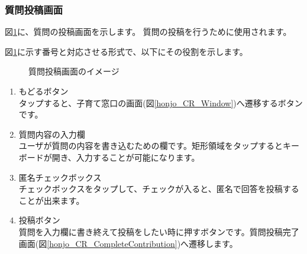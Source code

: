 \documentclass[a4j]{jarticle}
\begin{document}
\subsubsection{質問投稿画面}
図\ref{honjo_CR_Contribution}に、質問の投稿画面を示します。
質問の投稿を行うために使用されます。

図\ref{honjo_CR_Contribution}に示す番号と対応させる形式で、以下にその役割を示します。

\begin{figure}[H]
    \begin{center}
    \caption {質問投稿画面のイメージ}
    \label{honjo_CR_Contribution}
    \end{center}
\end{figure}

\begin{enumerate}
  \renewcommand{\labelenumi}{\textcircled{\scriptsize \theenumi}}
  \item もどるボタン\\
        タップすると、子育て窓口の画面(図\ref{honjo_CR_Window})へ遷移するボタンです。
  \item 質問内容の入力欄\\
        ユーザが質問の内容を書き込むための欄です。矩形領域をタップするとキーボードが開き、入力することが可能になります。
  \item 匿名チェックボックス\\
        チェックボックスをタップして、チェックが入ると、匿名で回答を投稿することが出来ます。
  \item 投稿ボタン\\
        質問を入力欄に書き終えて投稿をしたい時に押すボタンです。質問投稿完了画面(図\ref{honjo_CR_CompleteContribution})へ遷移します。
\end{enumerate}
\end{document}
